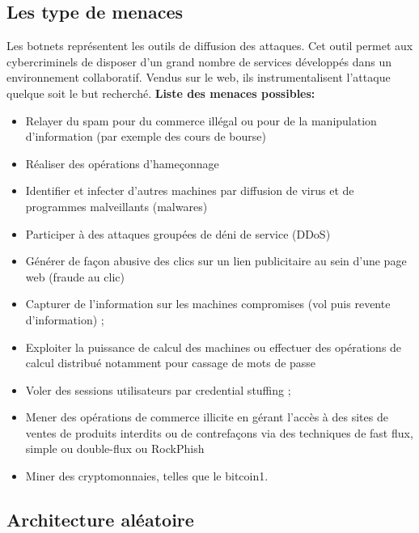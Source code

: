 
\subsection{Les type de menaces}
Les botnets représentent les outils de diffusion des attaques.
Cet outil permet aux cybercriminels de disposer d'un grand nombre de services développés dans un environnement collaboratif. Vendus sur le web, ils instrumentalisent l'attaque quelque soit le but recherché.
\newline \textbf{Liste des menaces possibles:}
\begin{itemize}
	\item Relayer du spam pour du commerce illégal ou pour de la manipulation d'information (par exemple des cours de bourse) 
  \item Réaliser des opérations d'hameçonnage 
  \item Identifier et infecter d’autres machines par diffusion de virus et de programmes malveillants (malwares) 
  \item Participer à des attaques groupées de déni de service (DDoS)
  \item Générer de façon abusive des clics sur un lien publicitaire au sein d’une page web (fraude au clic) 
  \item Capturer de l’information sur les machines compromises (vol puis revente d'information) ;
  \item Exploiter la puissance de calcul des machines ou effectuer des opérations de calcul distribué notamment pour cassage de mots de passe 
  \item Voler des sessions utilisateurs par credential stuffing ;
  \item Mener des opérations de commerce illicite en gérant l'accès à des sites de ventes de produits interdits ou de contrefaçons via des techniques de fast flux, simple ou double-flux ou RockPhish 
  \item Miner des cryptomonnaies, telles que le bitcoin1.
\end{itemize}


\newpage\subsection{Architecture aléatoire}


